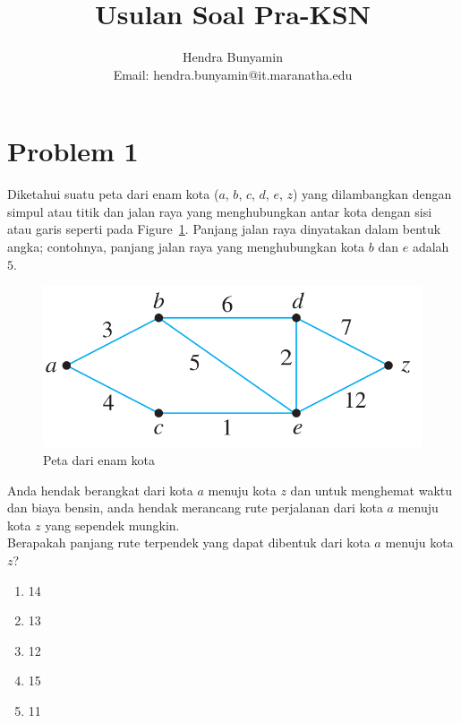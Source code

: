 \documentclass{article}
\title{Usulan Soal Pra-KSN}
\author{Hendra Bunyamin \\ {\small Email: hendra.bunyamin@it.maranatha.edu}}
\theoremstyle{plain}
\begin{document}
\maketitle



\section*{Problem 1}
Diketahui suatu peta dari enam kota ($a$, $b$, $c$, $d$, $e$, $z$) yang dilambangkan dengan simpul atau titik dan jalan raya yang menghubungkan antar kota dengan sisi atau garis seperti pada Figure~\ref{fig:peta-enam-kota}. Panjang jalan raya dinyatakan dalam bentuk angka; contohnya, panjang jalan raya yang menghubungkan kota $b$ dan $e$ adalah $5$. 

\begin{figure}[!ht]
	\centering
	\includegraphics[scale=.25]{images/dijkstra}
	\caption{Peta dari enam kota}
	\label{fig:peta-enam-kota}
\end{figure}

\noindent Anda hendak berangkat dari kota $a$ menuju kota $z$ dan untuk menghemat waktu dan biaya bensin, anda hendak merancang rute perjalanan dari kota $a$ menuju kota $z$ yang sependek mungkin.\\
Berapakah panjang rute terpendek yang dapat dibentuk dari kota $a$ menuju kota $z$?
	\begin{enumerate}[-,topsep=0pt, nosep,label=\alph*. ]
		\item 14
		\item 13
		\item 12
		\item 15
		\item 11
	\end{enumerate}
\end{document}
